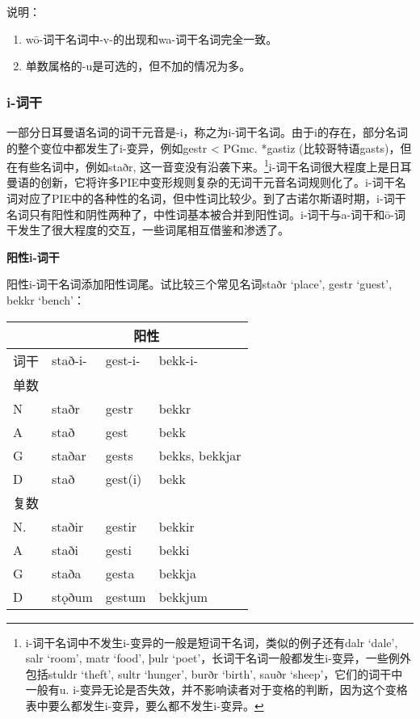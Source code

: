 说明：

\begin{enumerate}
\def\labelenumi{\arabic{enumi})}
\item
  wō-词干名词中-v-的出现和wa-词干名词完全一致。
\item
  单数属格的-u是可选的，但不加的情况为多。
\end{enumerate}

\subsubsection{i-词干}\label{i-ux8bcdux5e72}

一部分日耳曼语名词的词干元音是-i，称之为i-词干名词。由于i的存在，部分名词的整个变位中都发生了i-变异，例如gestr
\textless{} PGmc. *gastiz (比较哥特语gasts)，但在有些名词中，例如staðr,
这一音变没有沿袭下来。\footnote{i-词干名词中不发生i-变异的一般是短词干名词，类似的例子还有dalr
  `dale', salr `room', matr `food', þulr
  `poet'，长词干名词一般都发生i-变异，一些例外包括stuldr `theft', sultr
  `hunger', burðr `birth', sauðr `sheep'，它们的词干中一般有u.
  i-变异无论是否失效，并不影响读者对于变格的判断，因为这个变格表中要么都发生i-变异，要么都不发生i-变异。}i-词干名词很大程度上是日耳曼语的创新，它将许多PIE中变形规则复杂的无词干元音名词规则化了。i-词干名词对应了PIE中的各种性的名词，但中性词比较少。到了古诺尔斯语时期，i-词干名词只有阳性和阴性两种了，中性词基本被合并到阳性词。i-词干与a-词干和ō-词干发生了很大程度的交互，一些词尾相互借鉴和渗透了。

\textbf{阳性i-词干}

阳性i-词干名词添加阳性词尾。试比较三个常见名词staðr `place', gestr
`guest', bekkr `bench'：

\begin{longtable}{llll}
\toprule
 &\multicolumn{3}{c}{阳性} \\
\midrule
\endhead
\bottomrule
\endfoot
词干 & stað-i- & gest-i- & bekk-i- \\
单数 & & & \\
N & staðr & gestr & bekkr \\
A & stað & gest & bekk \\
G & staðar & gests & bekks, bekkjar \\
D & stað & gest(i) & bekk \\
复数 & & & \\
N. & staðir & gestir & bekkir \\
A & staði & gesti & bekki \\
G & staða & gesta & bekkja \\
D & stǫðum & gestum & bekkjum \\
\end{longtable}

